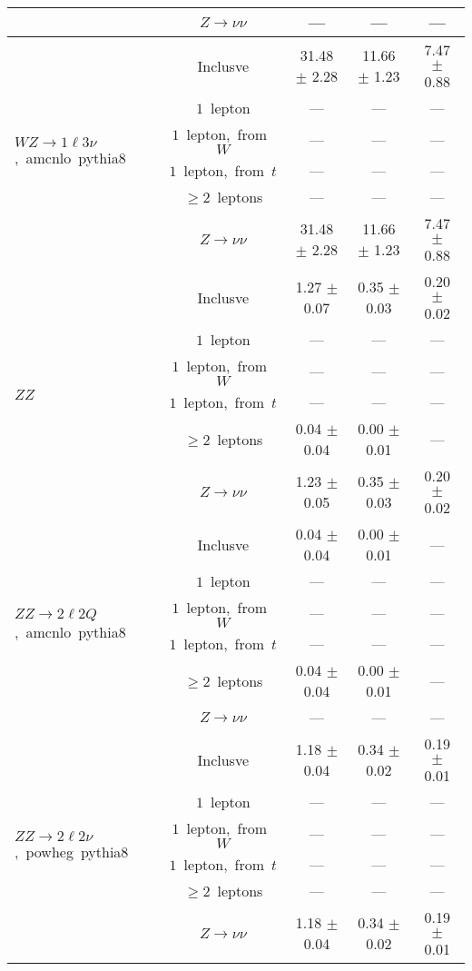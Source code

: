 \documentclass{article}
\begin{document}
\begin{longtable}{|l|c|c|c|c|}
 & $Z\rightarrow\nu\nu$  & ---  & ---  & --- \\* 
\hline 
\multirow{6}{*}{$WZ{\rightarrow}1{\ell}3{\nu}$,~amcnlo~pythia8} & Inclusve  & 31.48 $\pm$ 2.28  & 11.66 $\pm$ 1.23  & 7.47 $\pm$ 0.88 \\* 
 & $1$~lepton  & ---  & ---  & --- \\* 
 & $1$~lepton,~from~$W$  & ---  & ---  & --- \\* 
 & $1$~lepton,~from~$t$  & ---  & ---  & --- \\* 
 & $\ge2$~leptons  & ---  & ---  & --- \\* 
 & $Z\rightarrow\nu\nu$  & 31.48 $\pm$ 2.28  & 11.66 $\pm$ 1.23  & 7.47 $\pm$ 0.88 \\* 
\hline 
\multirow{6}{*}{$ZZ$} & Inclusve  & 1.27 $\pm$ 0.07  & 0.35 $\pm$ 0.03  & 0.20 $\pm$ 0.02 \\* 
 & $1$~lepton  & ---  & ---  & --- \\* 
 & $1$~lepton,~from~$W$  & ---  & ---  & --- \\* 
 & $1$~lepton,~from~$t$  & ---  & ---  & --- \\* 
 & $\ge2$~leptons  & 0.04 $\pm$ 0.04  & 0.00 $\pm$ 0.01  & --- \\* 
 & $Z\rightarrow\nu\nu$  & 1.23 $\pm$ 0.05  & 0.35 $\pm$ 0.03  & 0.20 $\pm$ 0.02 \\* 
\hline 
\multirow{6}{*}{$ZZ{\rightarrow}2{\ell}2Q$,~amcnlo~pythia8} & Inclusve  & 0.04 $\pm$ 0.04  & 0.00 $\pm$ 0.01  & --- \\* 
 & $1$~lepton  & ---  & ---  & --- \\* 
 & $1$~lepton,~from~$W$  & ---  & ---  & --- \\* 
 & $1$~lepton,~from~$t$  & ---  & ---  & --- \\* 
 & $\ge2$~leptons  & 0.04 $\pm$ 0.04  & 0.00 $\pm$ 0.01  & --- \\* 
 & $Z\rightarrow\nu\nu$  & ---  & ---  & --- \\* 
\hline 
\multirow{6}{*}{$ZZ{\rightarrow}2{\ell}2{\nu}$,~powheg~pythia8} & Inclusve  & 1.18 $\pm$ 0.04  & 0.34 $\pm$ 0.02  & 0.19 $\pm$ 0.01 \\* 
 & $1$~lepton  & ---  & ---  & --- \\* 
 & $1$~lepton,~from~$W$  & ---  & ---  & --- \\* 
 & $1$~lepton,~from~$t$  & ---  & ---  & --- \\* 
 & $\ge2$~leptons  & ---  & ---  & --- \\* 
 & $Z\rightarrow\nu\nu$  & 1.18 $\pm$ 0.04  & 0.34 $\pm$ 0.02  & 0.19 $\pm$ 0.01 \\* 

\end{longtable}
\end{document}
